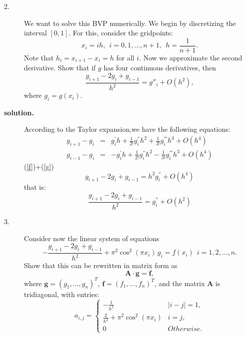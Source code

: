 \documentclass[12pt]{article}
\begin{document}
\begin{description}
\item[2.] We want to solve this BVP
numerically. We begin by
discretizing the interval $[0,1]$. For this, consider the gridpoints:
\begin{equation}
x_i = i h,\ \ i=0,1,\dots,n+1,\  \ h=\frac{1}{n+1}.
\end{equation}
Note that $h_i = x_{i+1}-x_i = h$ for all $i$.  Now we approximate the
second derivative. Show that if $g$ has four
continuous derivatives, then
\begin{equation}
\label{approx}
\frac{g_{i+1}-2g_i+g_{i-1}}{h^2} = g''_i + O(h^2),
\end{equation}
where $g_i = g(x_i)$.


\item[\textbf{solution.}]
According to the Taylor expansion,we have the following equations:
\begin{eqnarray}
    \label{f}
    g_{i+1}-g_{i} &=& g_{i}^{'}h+\frac{1}{2!}g_{i}^{''}h^{2}+\frac{1}{3!}g_{i}^{'''}h^{3}+O(h^4)  \\
    \label{g}
    g_{i-1}-g_{i} &=& -g_{i}^{'}h+\frac{1}{2!}g_{i}^{''}h^{2}-\frac{1}{3!}g_{i}^{'''}h^{3}+O(h^4)
\end{eqnarray}
(\ref{f})+(\ref{g})
\begin{equation}
    \label{h}
    g_{i+1}-2g_i+g_{i-1} = h^2g_i^{''}+O(h^4)
\end{equation}
that is:
\begin{equation}
    \label{i}
    \frac{g_{i+1}-2g_i+g_{i-1}}{h^2}=g_i^{''}+O(h^2)
    \end{equation}

\item[3.] Consider now the linear system of equations
\begin{equation}
\label{system}
- \frac{g_{i+1}-2g_i+g_{i-1}}{h^2}+\pi^2 \cos^2 (\pi x_i )\, g_i = f(x_i)\
\ i=1,2,\dots,n.
\end{equation}
Show that this can be rewritten in matrix form as
\[
\bm{ A} \cdot \bm{ g} = \bm{ f},
\]
where $\bm{ g} = (g_1,\dots,g_{n})^T$,
$\bm{ f} = (f_1,\dots,f_{n})^T$, and the matrix $\bm{ A}$ is
tridiagonal, with entries:
\begin{equation}
a_{i,j} = \left \lbrace \begin{array}{cr} -\frac{1}{h^2}& |i-j|=1, \\
	\frac{2}{h^2} + \pi^2 \cos^2(\pi x_i) & i=j, \\
0& Otherwise. \end{array}
\right .
\end{equation}


\end{description}
\end{document}
